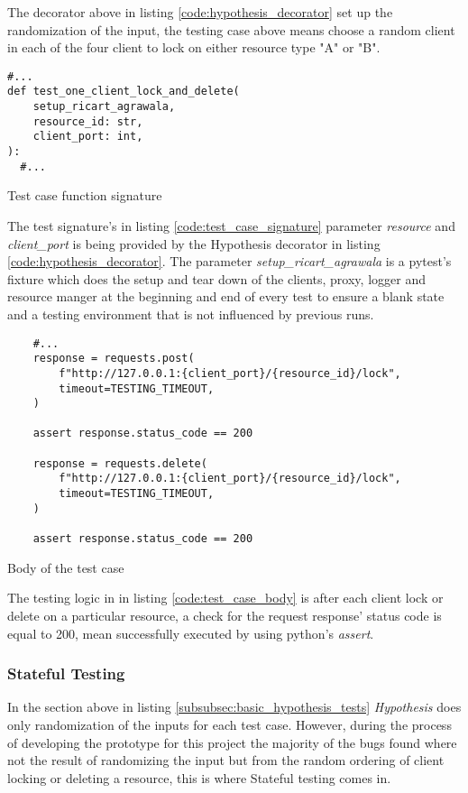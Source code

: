 The decorator above in listing \ref{code:hypothesis_decorator} set up the randomization of the input, the testing case above 
means choose a random client in each of the four client to lock on either resource 
type "A" or "B".

\begin{listing}[!ht]
  \begin{verbatim}
#...
def test_one_client_lock_and_delete(
    setup_ricart_agrawala,
    resource_id: str,
    client_port: int,
):
  #...
  \end{verbatim}
  \caption{Test case function signature}
  \label{code:test_case_signature}
\end{listing}

The test signature's in listing \ref{code:test_case_signature} parameter \textit{resource} 
and \textit{client\_port} is being provided by the Hypothesis decorator 
in listing \ref{code:hypothesis_decorator}. The parameter \textit{setup\_ricart\_agrawala}
is a pytest's fixture which does the setup and tear down of the clients, proxy, logger 
and resource manger at the beginning and end of every test to ensure a blank state 
and a testing environment that is not influenced by previous runs.

\begin{listing}[!ht]
  \begin{verbatim}
    #...
    response = requests.post(
        f"http://127.0.0.1:{client_port}/{resource_id}/lock",
        timeout=TESTING_TIMEOUT,
    )

    assert response.status_code == 200

    response = requests.delete(
        f"http://127.0.0.1:{client_port}/{resource_id}/lock",
        timeout=TESTING_TIMEOUT,
    )

    assert response.status_code == 200
  \end{verbatim}
  \caption{Body of the test case}
  \label{code:test_case_body}
\end{listing}


The testing logic in in listing \ref{code:test_case_body} is after each client lock or delete
on a particular resource, a check for the request response' status code is equal 
to 200, mean successfully executed by using python's \textit{assert}.

\subsubsection{Stateful Testing}
In the section above in listing \ref{subsubsec:basic_hypothesis_tests} \textit{Hypothesis} 
does only randomization of the inputs for each test case. However, during the process
of developing the prototype for this project the majority of the bugs found where
not the result of randomizing the input but from the random ordering of client 
locking or deleting a resource, this is where Stateful testing comes in.


